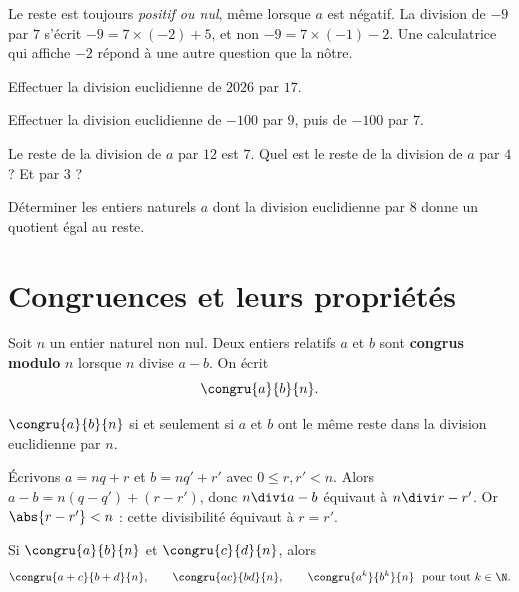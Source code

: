 \begin{avertissement}
Le reste est toujours \emph{positif ou nul}, même lorsque $a$ est négatif. La
division de $-9$ par $7$ s'écrit $-9 = 7\times(-2)+5$, et non
$-9 = 7\times(-1)-2$. Une calculatrice qui affiche $-2$ répond à une autre
question que la nôtre.
\end{avertissement}

\begin{entrainement}
\exo[\niveau{1}] Effectuer la division euclidienne de $2026$ par $17$.

\exo[\niveau{1}] Effectuer la division euclidienne de $-100$ par $9$, puis de
$-100$ par $7$.

\exo[\niveau{2}] Le reste de la division de $a$ par $12$ est $7$. Quel est le
reste de la division de $a$ par $4$ ? Et par $3$ ?

\exo[\niveau{3}] Déterminer les entiers naturels $a$ dont la division
euclidienne par $8$ donne un quotient égal au reste.
\end{entrainement}

\section{Congruences et leurs propriétés}

\begin{definition}
Soit $n$ un entier naturel non nul. Deux entiers relatifs $a$ et $b$ sont
\textbf{congrus modulo} $n$ lorsque $n$ divise $a-b$. On écrit
\[
  \congru{a}{b}{n} .
\]
\end{definition}

\begin{propriete}
$\congru{a}{b}{n}$ si et seulement si $a$ et $b$ ont le même reste dans la
division euclidienne par $n$.
\end{propriete}

\begin{demonstration}
Écrivons $a = nq+r$ et $b = nq'+r'$ avec $0 \leq r,r' < n$. Alors
$a-b = n(q-q')+(r-r')$, donc $n \divi a-b$ équivaut à $n \divi r-r'$. Or
$\abs{r-r'} < n$ : cette divisibilité équivaut à $r = r'$.
\end{demonstration}

\begin{propriete}
Si $\congru{a}{b}{n}$ et $\congru{c}{d}{n}$, alors
\[
  \congru{a+c}{b+d}{n}, \qquad \congru{ac}{bd}{n}, \qquad
  \congru{a^{k}}{b^{k}}{n} \ \text{ pour tout } k \in \N .
\]
\end{propriete}

